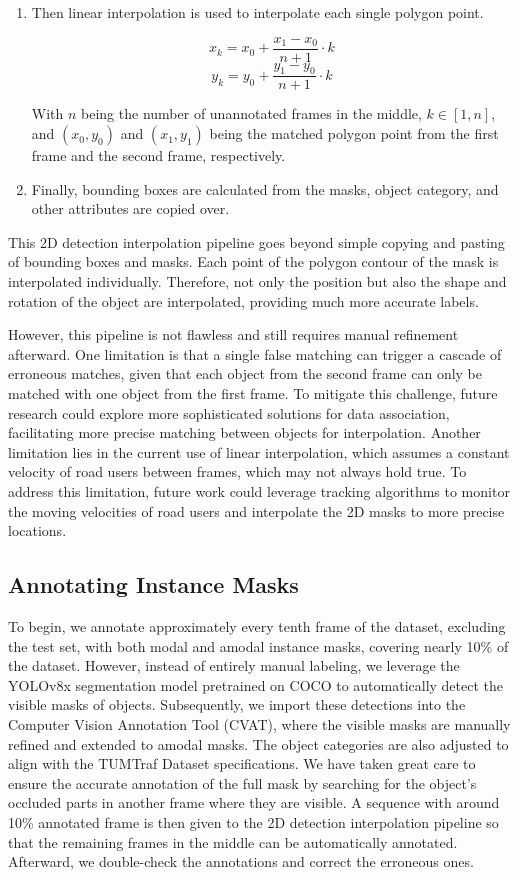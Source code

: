 \begin{enumerate}
	\item Then linear interpolation is used to interpolate each single polygon point. 
	
	\[
	x_k = x_0 + \frac{{x_1 - x_0}}{{n + 1}} \cdot k
	\]
	\[
	y_k = y_0 + \frac{{y_1 - y_0}}{{n + 1}} \cdot k
	\]
	
	With \(n\) being the number of unannotated frames in the middle, \(k \in [1, n]\), and \((x_0, y_0)\) and \((x_1, y_1)\) being the matched polygon point from the first frame and the second frame, respectively.
	
	\item Finally, bounding boxes are calculated from the masks, object category, and other attributes are copied over.  
\end{enumerate}

This 2D detection interpolation pipeline goes beyond simple copying and pasting of bounding boxes and masks. Each point of the polygon contour of the mask is interpolated individually. Therefore, not only the position but also the shape and rotation of the object are interpolated, providing much more accurate labels. 

However, this pipeline is not flawless and still requires manual refinement afterward. One limitation is that a single false matching can trigger a cascade of erroneous matches, given that each object from the second frame can only be matched with one object from the first frame. To mitigate this challenge, future research could explore more sophisticated solutions for data association, facilitating more precise matching between objects for interpolation. Another limitation lies in the current use of linear interpolation, which assumes a constant velocity of road users between frames, which may not always hold true. To address this limitation, future work could leverage tracking algorithms to monitor the moving velocities of road users and interpolate the 2D masks to more precise locations.

\subsection{Annotating Instance Masks}  \label{sec:mask_annotation}

To begin, we annotate approximately every tenth frame of the dataset, excluding the test set, with both modal and amodal instance masks, covering nearly 10\% of the dataset. However, instead of entirely manual labeling, we leverage the YOLOv8x segmentation model pretrained on COCO to automatically detect the visible masks of objects. Subsequently, we import these detections into the Computer Vision Annotation Tool (CVAT), where the visible masks are manually refined and extended to amodal masks. The object categories are also adjusted to align with the TUMTraf Dataset specifications. We have taken great care to ensure the accurate annotation of the full mask by searching for the object's occluded parts in another frame where they are visible. A sequence with around 10\% annotated frame is then given to the 2D detection interpolation pipeline so that the remaining frames in the middle can be automatically annotated. Afterward, we double-check the annotations and correct the erroneous ones. 

